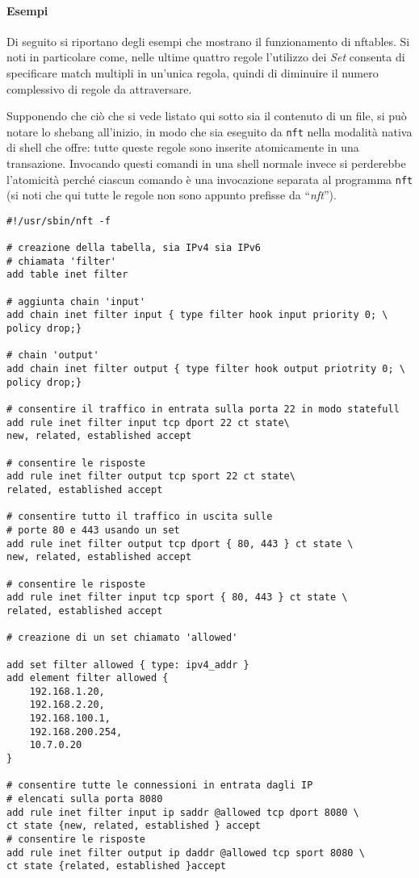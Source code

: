 \paragraph{Esempi}
Di seguito si riportano degli esempi che mostrano il funzionamento di nftables.
Si noti in particolare come, nelle ultime quattro regole l'utilizzo dei \textit{Set}
consenta di specificare match multipli in un'unica regola, quindi di diminuire il
numero complessivo di regole da attraversare.

Supponendo che ciò che si vede listato qui sotto sia il contenuto di un file,
si può notare lo shebang all'inizio, in modo che sia eseguito da \texttt{nft} nella
modalità nativa di shell che offre: tutte queste regole sono inserite atomicamente
in una transazione. Invocando questi comandi in una shell normale invece si
perderebbe l'atomicità perché ciascun comando è una invocazione separata al programma \texttt{nft}
(si noti che qui tutte le regole non sono appunto prefisse da ``\textit{nft}'').
\begin{verbatim}
#!/usr/sbin/nft -f
	
# creazione della tabella, sia IPv4 sia IPv6
# chiamata 'filter'
add table inet filter
	
# aggiunta chain 'input'
add chain inet filter input { type filter hook input priority 0; \
policy drop;}
	
# chain 'output'
add chain inet filter output { type filter hook output priotrity 0; \
policy drop;}
	
# consentire il traffico in entrata sulla porta 22 in modo statefull
add rule inet filter input tcp dport 22 ct state\
new, related, established accept
	
# consentire le risposte
add rule inet filter output tcp sport 22 ct state\
related, established accept
	
# consentire tutto il traffico in uscita sulle
# porte 80 e 443 usando un set
add rule inet filter output tcp dport { 80, 443 } ct state \
new, related, established accept
	
# consentire le risposte
add rule inet filter input tcp sport { 80, 443 } ct state \
related, established accept
	
# creazione di un set chiamato 'allowed'
	
add set filter allowed { type: ipv4_addr }
add element filter allowed {
	192.168.1.20,
	192.168.2.20,
	192.168.100.1,
	192.168.200.254,
	10.7.0.20
}
	
# consentire tutte le connessioni in entrata dagli IP
# elencati sulla porta 8080
add rule inet filter input ip saddr @allowed tcp dport 8080 \
ct state {new, related, established } accept
# consentire le risposte
add rule inet filter output ip daddr @allowed tcp sport 8080 \
ct state {related, established }accept
\end{verbatim}
